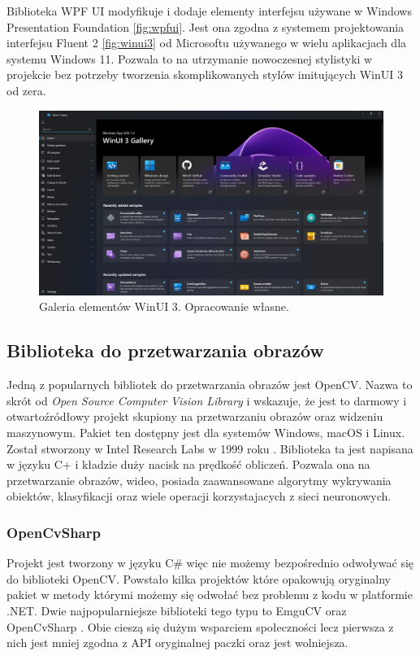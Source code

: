 Biblioteka WPF UI \cite{wpfui} modyfikuje i dodaje elementy interfejsu używane w Windows Presentation Foundation \autoref{fig:wpfui}. 
Jest ona zgodna z systemem projektowania interfejsu Fluent 2 \autoref{fig:winui3} od Microsoftu używanego w wielu aplikacjach dla systemu Windows 11. 
Pozwala to na utrzymanie nowoczesnej stylistyki w projekcie bez potrzeby tworzenia skomplikowanych stylów imitujących WinUI 3 od zera.

\begin{figure}[H]
    \centering
    \includegraphics[width=0.9\linewidth]{./images/Picture9.png}
    \caption{Galeria elementów WinUI 3. Opracowanie własne.}
    \label{fig:winui3}
\end{figure}

\subsection{Biblioteka do przetwarzania obrazów}
Jedną z popularnych bibliotek do przetwarzania obrazów jest OpenCV.
Nazwa to skrót od \textit{Open Source Computer Vision Library} i wskazuje, że jest to darmowy i otwartoźródłowy projekt skupiony na przetwarzaniu obrazów oraz widzeniu maszynowym.
Pakiet ten dostępny jest dla systemów Windows, macOS i Linux. 
Został stworzony w Intel Research Labs w 1999 roku \cite{opencvHistory}. Biblioteka ta jest napisana w języku C\++ i kładzie duży nacisk na prędkość obliczeń. Pozwala ona na przetwarzanie obrazów, wideo, posiada zaawansowane algorytmy wykrywania obiektów, klasyfikacji oraz wiele operacji korzystajacych z sieci neuronowych.

\subsubsection{OpenCvSharp}

Projekt jest tworzony w języku C\# więc nie możemy bezpośrednio odwoływać się do biblioteki OpenCV. Powstało kilka projektów które opakowują oryginalny pakiet w metody którymi możemy się odwołać bez problemu z kodu w platformie .NET. Dwie najpopularniejsze biblioteki tego typu to EmguCV \cite{emgucv} oraz OpenCvSharp \cite{opencvsharp}. 
Obie cieszą się dużym wsparciem społeczności lecz pierwsza z nich jest mniej zgodna z API oryginalnej paczki oraz jest wolniejsza.

